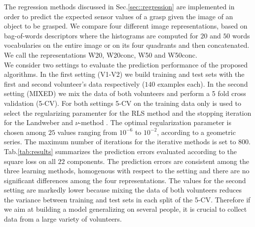 The regression methods discussed in Sec.\ref{sec::regression} are implemented in order to predict the expected sensor values of a grasp given the image of an object to be grasped. 
We compare four different image representations, based on bag-of-words descriptors where the histograms are computed for $20$ and $50$ words vocabularies on the entire image or on its four quadrants and then concatenated. We call the representations W20, W20conc, W50 and W50conc.\\
We consider two settings to evaluate the prediction performance of the proposed algorithms. In the first setting (V1-V2) we build training and test sets with the first and second volunteer's data respectively ($140$ examples each). In the second setting (MIXED) we mix the data of both volunteers and perform a 5 fold cross validation (5-CV). For both settings 5-CV on the training data only is used to select the regularizing paramenter for the RLS method and the stopping iteration for the Landweber 
\cite{bulmann02boosting,LoGerfo08Spectral} and $\nu$-method \cite{LoGerfo08Spectral}. The optimal regularization parameter is chosen among $25$ values ranging from $10^{-6}$ to $10^{-2}$, according to a geometric series. The maximum number of iterations for the iterative methods is set to $800$.
Tab.\ref{tab:results} summarizes the prediction errors evaluated according to the square loss on all $22$ components.
The prediction errors are consistent among the three learning methods, homogenous with respect to the setting and there are no significant differences among the four representations.
The values for the second setting are markedly lower because mixing the data of both volunteers reduces the variance between training and test sets in each split of the 5-CV. Therefore if we aim at building a model generalizing on several people, it is crucial to collect data from a large variety of volunteers.\\
